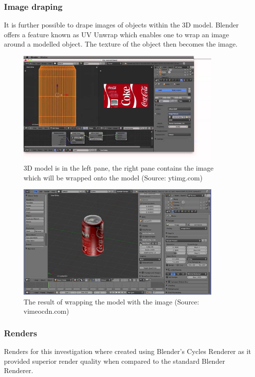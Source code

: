 \documentclass[11pt,a4paper]{report}
\begin{document}
			\subsubsection{Image draping}
				It is further possible to drape images of objects within the 3D model. Blender offers a feature known as UV Unwrap which enables one to wrap an image around a modelled object. The texture of the object then becomes the image.
				\begin{figure}[H]
					\centering
					\includegraphics[width=0.9\textwidth]{blender_uv_unwrap_1}
					\caption{3D model is in the left pane, the right pane contains the image which will be wrapped onto the model (Source: ytimg.com)}
					\label{fig:blender_uv_unwrap_1}
				\end{figure}
				\begin{figure}[H]
					\centering
					\includegraphics[width=0.9\textwidth]{blender_uv_unwrap_2}
					\caption{The result of wrapping the model with the image (Source: vimeocdn.com)}
					\label{fig:blender_uv_unwrap_2}
				\end{figure}
				
			\subsubsection{Renders}
				Renders for this investigation where created using Blender's Cycles Renderer as it provided superior render quality when compared to the standard Blender Renderer.
				
\end{document}
